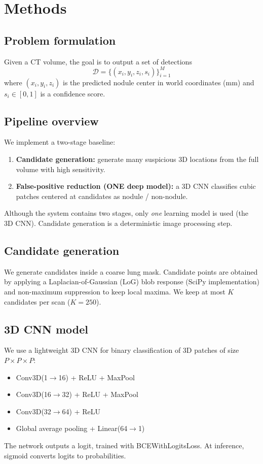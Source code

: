 \section{Methods}
\subsection{Problem formulation}
Given a CT volume, the goal is to output a set of detections
\[
\mathcal{D}=\{(x_i,y_i,z_i,s_i)\}_{i=1}^{M}
\]
where $(x_i,y_i,z_i)$ is the predicted nodule center in world coordinates (mm) and $s_i \in [0,1]$ is a confidence score.

\subsection{Pipeline overview}
We implement a two-stage baseline:
\begin{enumerate}
  \item \textbf{Candidate generation:} generate many suspicious 3D locations from the full volume with high sensitivity.
  \item \textbf{False-positive reduction (ONE deep model):} a 3D CNN classifies cubic patches centered at candidates as nodule / non-nodule.
\end{enumerate}
Although the system contains two stages, only \emph{one} learning model is used (the 3D CNN). Candidate generation is a deterministic image processing step.

\subsection{Candidate generation}
We generate candidates inside a coarse lung mask. Candidate points are obtained by applying a Laplacian-of-Gaussian (LoG) blob response (SciPy implementation) and non-maximum suppression to keep local maxima. We keep at most $K$ candidates per scan ($K=250$).

\subsection{3D CNN model}
We use a lightweight 3D CNN for binary classification of 3D patches of size $P\times P\times P$:
\begin{itemize}
  \item Conv3D(1$\rightarrow$16) + ReLU + MaxPool
  \item Conv3D(16$\rightarrow$32) + ReLU + MaxPool
  \item Conv3D(32$\rightarrow$64) + ReLU
  \item Global average pooling + Linear(64$\rightarrow$1)
\end{itemize}
The network outputs a logit, trained with BCEWithLogitsLoss. At inference, sigmoid converts logits to probabilities.

